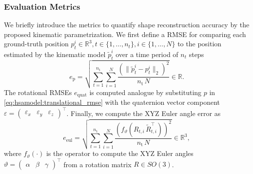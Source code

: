 \subsubsection{Evaluation Metrics}\label{ssub:hsamodel:hsa_rod_kinematics:evaluation_metrics}
We briefly introduce the metrics to quantify shape reconstruction accuracy by the proposed kinematic parametrization. 
We first define a \gls{RMSE} for comparing each ground-truth position $p_t^i \in \mathbb{R}^{3}, t \in \{1,\dots,n_t\}, i \in \{1,\dots,N\}$ to the position estimated by the kinematic model $\tilde{p}_t^i$ over a time period of $n_t$ steps
\begin{equation}\label{eq:hsamodel:translational_rmse}
    e_{\mathrm{p}} = \sqrt{\sum_{t = 1}^{n_\mathrm{t}} \sum_{i = 1}^{N} \frac{\left (\big\lVert \tilde{p}_t^i - p_t^i \big\rVert_2 \right )^2}{n_\mathrm{t} \, N}}  \in \mathbb{R}.
\end{equation}
The rotational \glspl{RMSE} $e_{\mathrm{quat}}$ is computed analogue by substituting $p$ in \eqref{eq:hsamodel:translational_rmse} with the quaternion vector component $\varepsilon = \begin{pmatrix}\varepsilon_x & \varepsilon_y & \varepsilon_z \end{pmatrix}^\top$.
Finally, we compute the XYZ Euler angle error as 
\begin{equation}
    e_\mathrm{eul} = \sqrt{\sum_{t = 1}^{n_\mathrm{t}} \sum_{i = 1}^{N} \frac{\left ( f_\vartheta(R_{t,i} \, \tilde{R}_{t,i}^\top) \right )^2}{n_\mathrm{t} \, N}} \in \mathbb{R}^3,
\end{equation}
where $f_\vartheta(\cdot)$ is the operator to compute the XYZ Euler angles $\vartheta = \begin{pmatrix}\alpha & \beta & \gamma \end{pmatrix}^\top$ from a rotation matrix $R \in SO(3)$.

